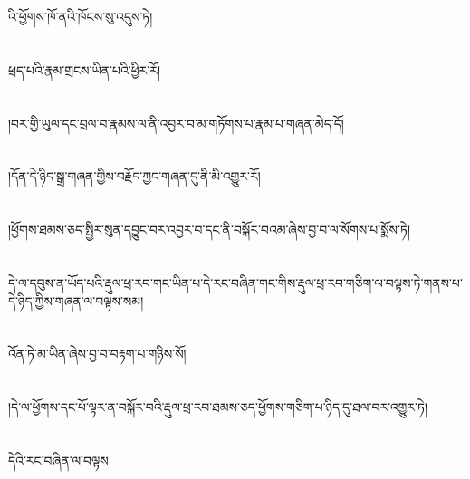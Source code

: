 འི་ཕྱོགས་ཁོ་ནའི་ཁོངས་སུ་འདུས་ཏེ།\chapter{ }ཕྲད་པའི་རྣམ་གྲངས་ཡིན་པའི་ཕྱིར་རོ།\chapter{ }།བར་གྱི་ཡུལ་དང་བྲལ་བ་རྣམས་ལ་ནི་འབྱར་བ་མ་གཏོགས་པ་རྣམ་པ་གཞན་མེད་དོ།\chapter{ }།དོན་དེ་ཉིད་སྒྲ་གཞན་གྱིས་བརྗོད་ཀྱང་གཞན་དུ་ནི་མི་འགྱུར་རོ།\chapter{ }།ཕྱོགས་ཐམས་ཅད་སྤྱིར་སུན་དབྱུང་བར་འབྱར་བ་དང་ནི་བསྐོར་བའམ་ཞེས་བྱ་བ་ལ་སོགས་པ་སྨོས་ཏེ།\chapter{ }དེ་ལ་དབུས་ན་ཡོད་པའི་རྡུལ་ཕྲ་རབ་གང་ཡིན་པ་དེ་རང་བཞིན་གང་གིས་རྡུལ་ཕྲ་རབ་གཅིག་ལ་བལྟས་ཏེ་གནས་པ་དེ་ཉིད་ཀྱིས་གཞན་ལ་བལྟས་སམ།\chapter{ }འོན་ཏེ་མ་ཡིན་ཞེས་བྱ་བ་བརྟག་པ་གཉིས་སོ།\chapter{ }།དེ་ལ་ཕྱོགས་དང་པོ་ལྟར་ན་བསྐོར་བའི་རྡུལ་ཕྲ་རབ་ཐམས་ཅད་ཕྱོགས་གཅིག་པ་ཉིད་དུ་ཐལ་བར་འགྱུར་ཏེ།\chapter{ }དེའི་རང་བཞིན་ལ་བལྟས